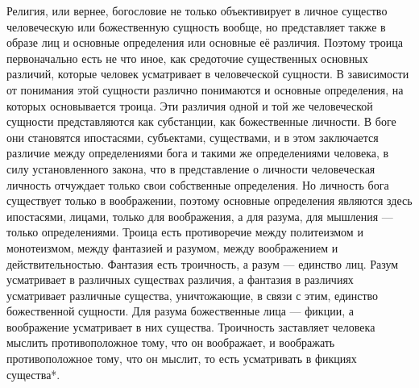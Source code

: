 \documentclass[12pt,oneside]{book}
\begin{document}
Религия, или вернее, богословие не только объективирует в личное существо человеческую или божественную сущность вообще, но представляет также в образе лиц и основные определения или основные её различия. Поэтому троица первоначально есть не что иное, как средоточие существенных основных различий, которые человек усматривает в человеческой сущности. В зависимости от понимания этой сущности различно понимаются и основные определения, на которых основывается троица. Эти различия одной и той же человеческой сущности представляются как субстанции, как божественные личности. В боге они становятся ипостасями, субъектами, существами, и в этом заключается различие между определениями бога и такими же определениями человека, в силу установленного закона, что в представление о личности человеческая личность отчуждает только свои собственные определения. Но личность бога существует только в воображении, поэтому основные определения являются здесь ипостасями, лицами, только для воображения, а для разума, для мышления --- только определениями. Троица есть противоречие между политеизмом и монотеизмом, между фантазией и разумом, между воображением и действительностью. Фантазия есть троичность, а разум --- единство лиц. Разум усматривает в различных существах различия, а фантазия в различиях усматривает различные существа, уничтожающие, в связи с этим, единство божественной сущности. Для разума божественные лица --- фикции, а воображение усматривает в них существа. Троичность заставляет человека мыслить противоположное тому, что он воображает, и воображать противоположное тому, что он мыслит, то есть усматривать в фикциях существа*\let\svthefootnote\thefootnote\let\thefootnote\relax{}\let\thefootnote\svthefootnote.
\end{document}
